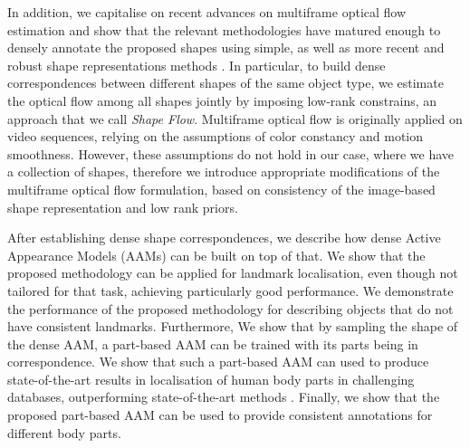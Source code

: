 In addition, we capitalise on recent advances on multiframe optical flow estimation \cite{Garg:2013hu} and show that the relevant methodologies have matured enough to densely annotate the proposed shapes using simple, as well as more recent and robust shape representations methods \cite{Nguyen2013}.
In particular, to build dense correspondences between different shapes of the same object type, we estimate the optical flow among all shapes jointly by imposing low-rank constrains, an approach that we call \emph{Shape Flow}. Multiframe optical flow is originally applied on video sequences, relying on the assumptions of color constancy and motion smoothness. However, these assumptions do not hold in our case, where we have a collection of shapes, therefore we introduce appropriate modifications of the multiframe optical flow formulation, based on consistency of the image-based shape representation and low rank priors.
%

After establishing dense shape correspondences, we describe how dense Active Appearance Models (AAMs) can be built on top of that. We show that the proposed methodology can be applied for landmark localisation, even though not tailored for that task, achieving particularly good performance. We demonstrate the performance of the proposed methodology for describing objects that do not have consistent landmarks. Furthermore, We show that by sampling the shape of the dense AAM, a part-based AAM can be trained with its parts being in correspondence. We show that such a part-based AAM can used to produce state-of-the-art results in localisation of human body parts in challenging databases, outperforming state-of-the-art methods \cite{pfister2015flowing}. Finally, we show that the proposed part-based AAM can be used to provide consistent annotations for different body parts.




